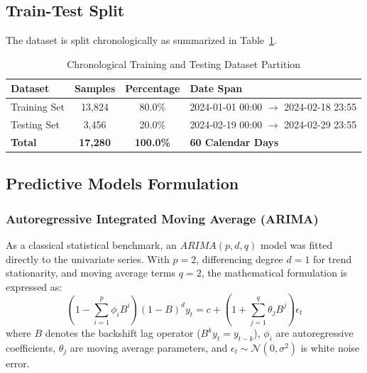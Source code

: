 \documentclass[12pt,a4paper]{article}
\begin{document}
\subsection{Train-Test Split}
The dataset is split chronologically as summarized in Table~\ref{tab:split_table}.

\begin{table}[H]
    \centering
    \caption{Chronological Training and Testing Dataset Partition}
    \label{tab:split_table}
    \renewcommand{\arraystretch}{1.3}
    \begin{tabular}{|l|c|c|p{4.5cm}|}
        \hline
        \textbf{Dataset} & \textbf{Samples} & \textbf{Percentage} & \textbf{Date Span} \\
        \hline
        Training Set & 13,824 & 80.0\% & 2024-01-01 00:00 $\to$ 2024-02-18 23:55 \\
        \hline
        Testing Set & 3,456 & 20.0\% & 2024-02-19 00:00 $\to$ 2024-02-29 23:55 \\
        \hline
        \textbf{Total} & \textbf{17,280} & \textbf{100.0\%} & \textbf{60 Calendar Days} \\
        \hline
    \end{tabular}
\end{table}

\subsection{Predictive Models Formulation}
\subsubsection{Autoregressive Integrated Moving Average (ARIMA)}
As a classical statistical benchmark, an $ARIMA(p, d, q)$ model was fitted directly to the univariate series. With $p=2$, differencing degree $d=1$ for trend stationarity, and moving average terms $q=2$, the mathematical formulation is expressed as:
\begin{equation}
    \left(1 - \sum_{i=1}^p \phi_i B^i\right) (1 - B)^d y_t = c + \left(1 + \sum_{j=1}^q \theta_j B^j\right) \epsilon_t
\end{equation}
where $B$ denotes the backshift lag operator ($B^k y_t = y_{t-k}$), $\phi_i$ are autoregressive coefficients, $\theta_j$ are moving average parameters, and $\epsilon_t \sim \mathcal{N}(0, \sigma^2)$ is white noise error.
\end{document}
